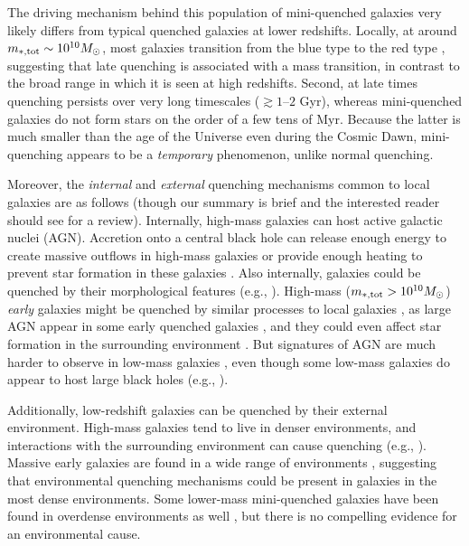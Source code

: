 \documentclass[a4paper,11pt]{article}
\begin{document}
The driving mechanism behind this population of mini-quenched galaxies very likely differs from typical quenched galaxies at lower redshifts. Locally, at around $m_{*, \rm tot} \sim 10^{10} M_{\odot}$, most galaxies transition from the blue type to the red type \cite{Martis2016}, suggesting that late quenching is associated with a mass transition, in contrast to the broad range in which it is seen at high redshifts. Second, at late times quenching persists over very long timescales ($\gtrsim 1$--$2$ Gyr), whereas mini-quenched galaxies do not form stars on the order of a few tens of Myr. Because the latter is much smaller than the age of the Universe even during the Cosmic Dawn, mini-quenching appears to be a \emph{temporary} phenomenon, unlike normal quenching. 

Moreover, the \textit{internal} and \textit{external} quenching mechanisms common to local galaxies are as follows (though our summary is brief and the interested reader should see \cite{DeLucia2025_review} for a review). Internally, high-mass galaxies can host active galactic nuclei (AGN). Accretion onto a central black hole can release enough energy to create massive outflows in high-mass galaxies \cite{Silk&Rees1998, Choi2015} or provide enough heating to prevent star formation in these galaxies \cite{Somerville2008}. Also internally, galaxies could be quenched by their morphological features (e.g., \cite{Martig2009_morphologicalquenching}). High-mass ($m_{*, \rm tot} > 10^{10} M_{\odot}$) \textit{early} galaxies might be quenched by similar processes to local galaxies \cite{Carnall2023_massive, Russell2025, Yang2025}, as large  AGN appear in some early quenched galaxies \cite{Carnall2023_singlegal, Baker2025, Stevenson2025}, and they could even affect star formation in the surrounding environment \cite{Zhu2025}. But signatures of AGN are much harder to observe in low-mass galaxies \cite{Hegde&Wyatt2024, Feltre2016, Gutkin2016, Sanders2023}, even though some low-mass galaxies do appear to host large black holes  (e.g., \cite{Harikane2023_AGN, Juodvbalis2025_AGN}).

Additionally, low-redshift galaxies can be quenched by their external environment. High-mass galaxies tend to live in denser environments, and interactions with the surrounding environment can cause quenching (e.g., \cite{Baldry2004, Balogh2017}). Massive early galaxies are found in a wide range of environments \cite{Binh2025, DeLucia2025, Singh2025}, suggesting that environmental quenching mechanisms could be present in galaxies in the most dense environments. Some lower-mass mini-quenched galaxies have been found in overdense environments as well \cite{Alberts2024, Baker2025_environment, Witten2025}, but there is no compelling evidence for an environmental cause.
\end{document}

